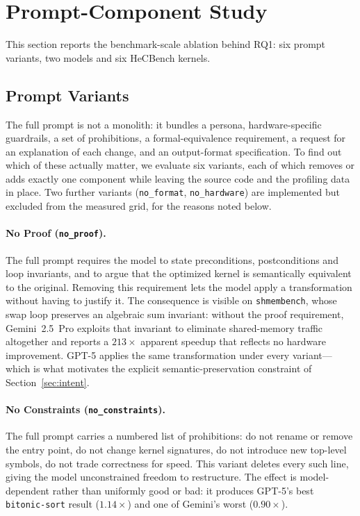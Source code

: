 \section{Prompt-Component Study}
\label{sec:prompts}
This section reports the benchmark-scale ablation behind RQ1: six prompt variants, two models and
six HeCBench kernels.

\subsection{Prompt Variants}
\label{sec:ablation}
The full prompt is not a monolith: it bundles a persona, hardware-specific guardrails, a set of
prohibitions, a formal-equivalence requirement, a request for an explanation of each change, and an
output-format specification. To find out which of these actually matter, we evaluate six variants, each
of which removes or adds exactly one component while leaving the source code and the profiling data
in place. Two further variants (\texttt{no\_format}, \texttt{no\_hardware}) are implemented but excluded
from the measured grid, for the reasons noted below.

\paragraph{No Proof (\texttt{no\_proof}).}
The full prompt requires the model to state preconditions, postconditions and loop invariants, and to
argue that the optimized kernel is semantically equivalent to the original. Removing this requirement
lets the model apply a transformation without having to justify it. The consequence is visible on
\texttt{shmembench}, whose swap loop preserves an algebraic sum invariant: without the proof
requirement, Gemini~2.5~Pro exploits that invariant to eliminate shared-memory traffic altogether and
reports a $213\times$ apparent speedup that reflects no hardware improvement. GPT-5 applies the same
transformation under every variant---which is what motivates the explicit
semantic-preservation constraint of Section~\ref{sec:intent}.

\paragraph{No Constraints (\texttt{no\_constraints}).}
The full prompt carries a numbered list of prohibitions: do not rename or remove the entry point, do
not change kernel signatures, do not introduce new top-level symbols, do not trade correctness for
speed. This variant deletes every such line, giving the model unconstrained freedom to restructure.
The effect is model-dependent rather than uniformly good or bad: it produces GPT-5's best
\texttt{bitonic-sort} result ($1.14\times$) and one of Gemini's worst ($0.90\times$).

